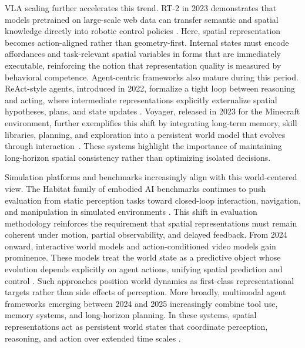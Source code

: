 VLA scaling further accelerates this trend.
RT-2 in 2023 demonstrates that models pretrained on large-scale web data can transfer semantic and spatial knowledge directly into robotic control policies \cite{zitkovich2023rt2}.
Here, spatial representation becomes action-aligned rather than geometry-first.
Internal states must encode affordances and task-relevant spatial variables in forms that are immediately executable, reinforcing the notion that representation quality is measured by behavioral competence.
Agent-centric frameworks also mature during this period.
ReAct-style agents, introduced in 2022, formalize a tight loop between reasoning and acting, where intermediate representations explicitly externalize spatial hypotheses, plans, and state updates \cite{yao2022react}.
Voyager, released in 2023 for the Minecraft environment, further exemplifies this shift by integrating long-term memory, skill libraries, planning, and exploration into a persistent world model that evolves through interaction~\cite{wang2023voyager}.
These systems highlight the importance of maintaining long-horizon spatial consistency rather than optimizing isolated decisions.



Simulation platforms and benchmarks increasingly align with this world-centered view.
The Habitat family of embodied AI benchmarks continues to push evaluation from static perception tasks toward closed-loop interaction, navigation, and manipulation in simulated environments \cite{savva2019habitat,szot2021habitat2,puig2023habitat3,Ramakrishnan2021HM3D}.
This shift in evaluation methodology reinforces the requirement that spatial representations must remain coherent under motion, partial observability, and delayed feedback.
From 2024 onward, interactive world models and action-conditioned video models gain prominence.
These models treat the world state as a predictive object whose evolution depends explicitly on agent actions, unifying spatial prediction and control \cite{cui2025emu35,bruce2024genie}.
Such approaches position world dynamics as first-class representational targets rather than side effects of perception.
More broadly, multimodal agent frameworks emerging between 2024 and 2025 increasingly combine tool use, memory systems, and long-horizon planning.
In these systems, spatial representations act as persistent world states that coordinate perception, reasoning, and action over extended time scales \cite{feng2025survey,yang2025embodiedbench,wang2023voyager}.




